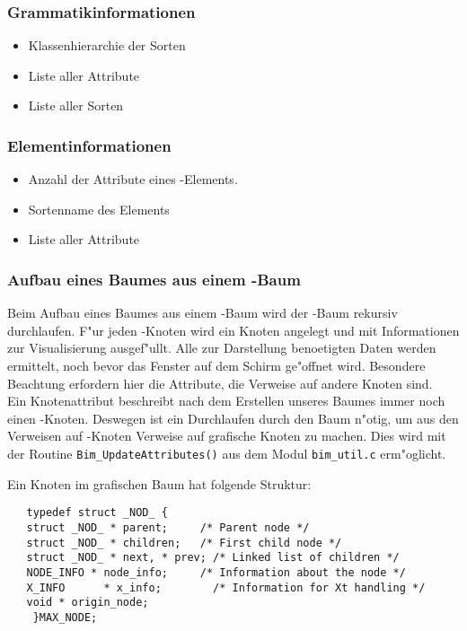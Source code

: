 \subsubsection{Grammatikinformationen}
    \begin{itemize}
	\item Klassenhierarchie der Sorten
	\item Liste aller Attribute
	\item Liste aller Sorten
    \end{itemize}
\subsubsection{Elementinformationen}
    \begin{itemize}
	\item Anzahl der Attribute eines \MAX-Elements.
	\item Sortenname des Elements
	\item Liste aller Attribute
    \end{itemize}
\subsubsection{Aufbau eines Baumes aus einem \MAX-Baum}
    Beim Aufbau eines Baumes aus einem \MAX-Baum wird der \MAX-Baum rekursiv
    durchlaufen. F"ur jeden \MAX-Knoten wird ein Knoten angelegt und mit Informationen
    zur Visualisierung ausgef"ullt. Alle zur Darstellung benoetigten Daten werden ermittelt,
    noch bevor das Fenster auf dem Schirm ge"offnet wird. Besondere
    Beachtung erfordern hier die Attribute, die Verweise auf andere Knoten sind.\\
    Ein Knotenattribut beschreibt nach dem Erstellen unseres Baumes immer noch einen
    \MAX-Knoten. Deswegen ist ein Durchlaufen durch den Baum n"otig, um aus den
    Verweisen auf \MAX-Knoten Verweise auf grafische Knoten zu machen. Dies wird
    mit der Routine {\tt Bim\_UpdateAttributes()} aus dem Modul {\tt bim\_util.c}
    erm"oglicht.

	Ein Knoten im grafischen Baum hat folgende Struktur:

	\begin{verbatim}
   typedef struct _NOD_ {
   struct _NOD_ * parent;     /* Parent node */
   struct _NOD_ * children;   /* First child node */
   struct _NOD_ * next, * prev; /* Linked list of children */
   NODE_INFO * node_info;     /* Information about the node */
   X_INFO      * x_info;        /* Information for Xt handling */
   void * origin_node;
	}MAX_NODE;
	\end{verbatim}


